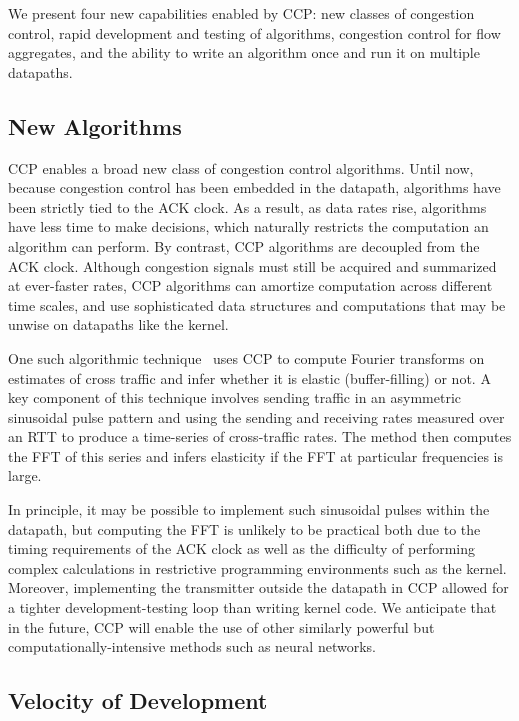 We present four new capabilities enabled by CCP: new classes of congestion control, rapid development and testing of algorithms, congestion control for flow aggregates, and the ability to write an algorithm once and run it on multiple datapaths.

\subsection{New Algorithms}
\label{s:capabilities:algs}

CCP enables a broad new class of congestion control algorithms.
Until now, because congestion control has been embedded in the datapath,
algorithms have been strictly tied to the ACK clock.
As a result, as data rates rise, algorithms have less time to make decisions,
which naturally restricts the computation an algorithm can perform.
By contrast, CCP algorithms are decoupled from the ACK clock.
Although congestion signals must still be acquired and summarized at ever-faster rates, CCP algorithms can amortize computation across different time scales, and use sophisticated data structures and computations that may be unwise on datapaths like the kernel.

One such algorithmic technique~\cite{nimbus} uses CCP to compute Fourier transforms on estimates of cross traffic and infer whether it is elastic (buffer-filling) or not.
A key component of this technique involves sending traffic in an asymmetric sinusoidal pulse pattern and using the sending and receiving rates measured over an RTT to produce a time-series of cross-traffic rates. The method then computes the FFT of this series and infers elasticity if the FFT at particular frequencies is large.

In principle, it may be possible to implement such sinusoidal pulses within the datapath, but computing the FFT is unlikely to be practical both due to the timing requirements of the ACK clock as well as the difficulty of performing complex calculations in restrictive programming environments such as the kernel. Moreover, implementing the transmitter outside the datapath in CCP allowed for a tighter development-testing loop than writing kernel code.
We anticipate that in the future, CCP will enable the use of other similarly powerful but computationally-intensive methods such as neural networks.

\subsection{Velocity of Development}
\label{s:capabilities:velocity}

